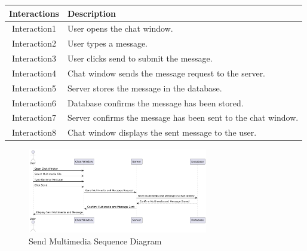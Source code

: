 \begin{longtable}{|c|p{10cm}|}
    \hline
    \textbf{Interactions} & \textbf{Description} \\
    \hline
    Interaction1 & User opens the chat window. \\
    \hline
    Interaction2 & User types a message. \\
    \hline
    Interaction3 & User clicks send to submit the message. \\
    \hline
    Interaction4 & Chat window sends the message request to the server. \\
    \hline
    Interaction5 & Server stores the message in the database. \\
    \hline
    Interaction6 & Database confirms the message has been stored. \\
    \hline
    Interaction7 & Server confirms the message has been sent to the chat window. \\
    \hline
    Interaction8 & Chat window displays the sent message to the user. \\
    \hline
\end{longtable}
\newpage

\begin{figure}[h]
    \centering
    \includegraphics[width=0.7\textwidth]{images/send_multimedia.png} %
    \caption{Send Multimedia Sequence Diagram}
    \label{fig:example}
\end{figure}


